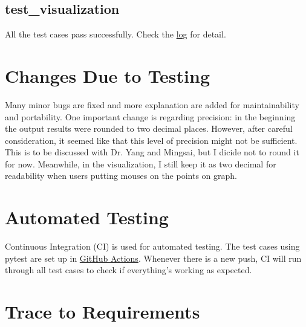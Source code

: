 \documentclass[12pt, titlepage]{article}
\begin{document}
\subsection{test\_visualization}
All the test cases pass successfully. Check the \href{}{log} for detail.

\section{Changes Due to Testing}
Many minor bugs are fixed and more explanation are added for maintainability and portability. One important change is regarding precision: in the beginning the output results were rounded to two decimal places. However, after careful consideration, it seemed like that this level of precision might not be sufficient. This is to be discussed with Dr. Yang and Mingsai, but I dicide not to round it for now. Meanwhile, in the visualization, I still keep it as two decimal for readability when users putting mouses on the points on graph.  

\section{Automated Testing}
Continuous Integration (CI) is used for automated testing. The test cases using pytest are set up in \href{https://github.com/CynthiaLiu0805/BridgeCorrosion/actions}{GitHub Actions}. Whenever there is a new push, CI will run through all test cases to check if everything's working as expected.

\section{Trace to Requirements}
\end{document}
